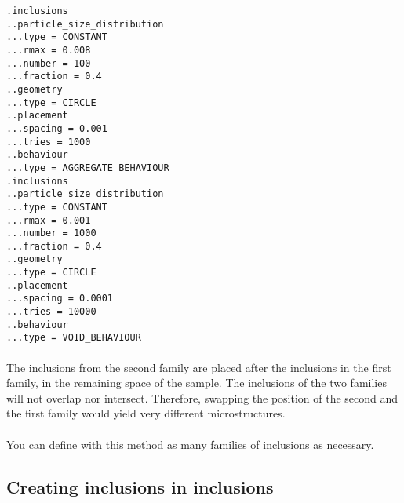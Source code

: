 \documentclass[10pt]{article}
\begin{document}
\noindent \verb+.inclusions+\\
\verb+..particle_size_distribution+\\
\verb+...type = CONSTANT+\\
\verb+...rmax = 0.008+\\
\verb+...number = 100+\\
\verb+...fraction = 0.4+\\
\verb+..geometry+\\
\verb+...type = CIRCLE+\\
\verb+..placement+\\
\verb+...spacing = 0.001+\\
\verb+...tries = 1000+\\
\verb+..behaviour+\\
\verb+...type = AGGREGATE_BEHAVIOUR+\\
\verb+.inclusions+\\
\verb+..particle_size_distribution+\\
\verb+...type = CONSTANT+\\
\verb+...rmax = 0.001+\\
\verb+...number = 1000+\\
\verb+...fraction = 0.4+\\
\verb+..geometry+\\
\verb+...type = CIRCLE+\\
\verb+..placement+\\
\verb+...spacing = 0.0001+\\
\verb+...tries = 10000+\\
\verb+..behaviour+\\
\verb+...type = VOID_BEHAVIOUR+

\paragraph{}The inclusions from the second family are placed after the inclusions in the first family, in the remaining space of the sample. The inclusions of the two families will not overlap nor intersect. Therefore, swapping the position of the second and the first family would yield very different microstructures.

\paragraph{}You can define with this method as many families of inclusions as necessary.

\subsection{Creating inclusions in inclusions}
\end{document}
